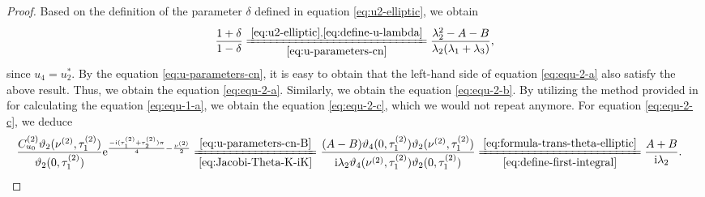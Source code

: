 \documentclass[11pt,reqno]{amsart}
\newcommand{\ii}{\mathrm{i}}
\newcommand{\ee}{\mathrm{e}}
\numberwithin{equation}{section}
\begin{document}
\begin{proof}
	Based on the definition of the parameter $\delta$ defined in equation \eqref{eq:u2-elliptic}, we obtain 
	\begin{equation}\label{eq:1-1}
		\begin{split}
			& \frac{1+\delta}{1-\delta}
			\xlongequal[\eqref{eq:u-parameters-cn}]{\eqref{eq:u2-elliptic},\eqref{eq:define-u-lambda}}
			\frac{\lambda_2^2-A-B}{\lambda_2(\lambda_1+\lambda_3)},\\
		\end{split}
	\end{equation}
	since $u_4=u_2^*$. 
    By the equation \eqref{eq:u-parameters-cn}, it is easy to obtain that the left-hand side of equation \eqref{eq:equ-2-a} also satisfy the above result. Thus, we obtain the equation \eqref{eq:equ-2-a}.
	Similarly, we obtain the equation \eqref{eq:equ-2-b}.
	By utilizing the method provided in  for calculating the equation \eqref{eq:equ-1-a}, we obtain the equation \eqref{eq:equ-2-c}, which we would not repeat anymore.
	For equation \eqref{eq:equ-2-c},
	we deduce 
	\begin{equation}
		\begin{split}
			\frac{C_{u_0}^{(2)}\vartheta_2( \nu^{(2)} , \tau^{(2)} _1)}{\vartheta_2(0, \tau^{(2)} _1)}\ee^{\frac{-\ii ( \tau^{(2)} _1+ \tau^{(2)} _2)\pi}{4}-\frac{ \nu^{(2)}}{2} }
			\xlongequal[\eqref{eq:Jacobi-Theta-K-iK}]{\eqref{eq:u-parameters-cn-B}}&\ \frac{(A-B)\vartheta_4(0, \tau^{(2)} _1)\vartheta_2( \nu^{(2)} , \tau^{(2)} _1)}{\ii\lambda_2\vartheta_4(\nu^{(2)},\tau^{(2)} _1)\vartheta_2(0, \tau^{(2)} _1)}
			\xlongequal[\eqref{eq:define-first-integral}]{\eqref{eq:formula-trans-theta-elliptic}}  
			\frac{A+B}{\ii \lambda_2}.
		\end{split}	
	\end{equation}
\end{proof}
\end{document}
